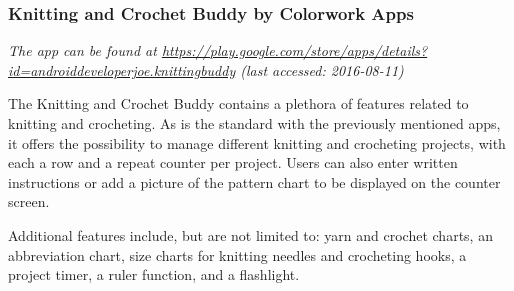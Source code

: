 \subsubsection*{Knitting and Crochet Buddy by Colorwork Apps}

\textit{ The app can be found at \url{https://play.google.com/store/apps/details?id=androiddeveloperjoe.knittingbuddy} \small{(last accessed: 2016-08-11)}}
\vspace*{0.5cm}

\noindent The Knitting and Crochet Buddy contains a plethora of features related to knitting and crocheting. As is the standard with the previously mentioned apps, it offers the possibility to manage different knitting and crocheting projects, with each a row and a repeat counter per project. Users can also enter written instructions or add a picture of the pattern chart to be displayed on the counter screen.

Additional features include, but are not limited to: yarn and crochet charts, an abbreviation chart, size charts for knitting needles and crocheting hooks, a project timer, a ruler function, and a flashlight.

